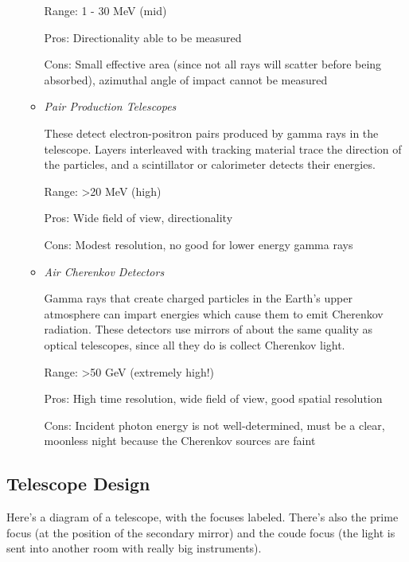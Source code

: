 \begin{enumerate}
\begin{itemize}
      Range: 1 - 30 MeV (mid)
      
      Pros: Directionality able to be measured
      
      Cons: Small effective area (since not all rays will scatter before being absorbed), azimuthal angle of impact cannot be measured
      
      \item \emph{Pair Production Telescopes}
      
      These detect electron-positron pairs produced by gamma rays in the telescope. Layers interleaved with tracking material trace the direction of the particles, and a scintillator or calorimeter detects their energies.
      
      Range: >20 MeV (high)
      
      Pros: Wide field of view, directionality
      
      Cons: Modest resolution, no good for lower energy gamma rays
      
      \item \emph{Air Cherenkov Detectors}
      
      Gamma rays that create charged particles in the Earth's upper atmosphere can impart energies which cause them to emit Cherenkov radiation. These detectors use mirrors of about the same quality as optical telescopes, since all they do is collect Cherenkov light.
      
      Range: >50 GeV (extremely high!)
      
      Pros: High time resolution, wide field of view, good spatial resolution
      
      Cons: Incident photon energy is not well-determined, must be a clear, moonless night because the Cherenkov sources are faint
      \end{itemize}
      
\end{enumerate}


\subsection{Telescope Design}
Here's a diagram of a telescope, with the focuses labeled.  There's also the 
prime focus (at the position of the secondary mirror) and the coude focus 
(the light is sent into another room with really big instruments).  

